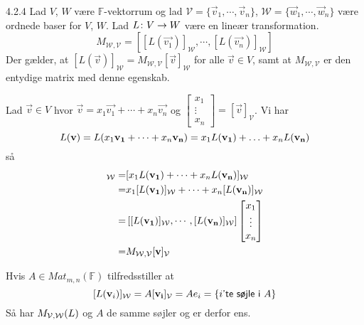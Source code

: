 %
% 

\begin{saetning}{4.2.4}
	Lad $V$, $W$ være $\mathbb{F}$-vektorrum og lad $\mathcal{V}=\{\vec{v}_1,
	\cdots,\vec{v}_n\}$, $\mathcal{W}=\{\vec{w}_1,\cdots,\vec{w}_n\}$ være
	ordnede baser for $V$, $W$. Lad $L \colon V \rightarrow W$ være en lineær transformation.
	\[
		M_{\mathcal{W},\mathcal{V}} = [[L(\vec{v_1})]_\mathcal{W}, \cdots,
		[L(\vec{v_n})]_\mathcal{W}]
	\]
	Der gælder, at $[L(\vec{v})]_\mathcal{W} = M_{\mathcal{W},\mathcal{V}}
	[\vec{v}]_\mathcal{W}$ for alle $\vec{v} \in V$, samt at
	$M_{\mathcal{W},\mathcal{V}}$ er den entydige matrix med denne egenskab.
\end{saetning}

\begin{bevis}
	Lad $\vec{v} \in V$ hvor $\vec{v} = x_1 \vec{v_1} + \cdots + x_n \vec{v_n}$
	og $\begin{bmatrix} x_1 \\ \vdots \\ x_n \end{bmatrix} =
	[\vec{v}]_\mathcal{V}$. Vi har
	\[
		L(\mathbf{v}) = L(x_1 \mathbf{v_1} + \cdots + x_n \mathbf{v_n}) = x_1L(\mathbf{v_1}) + 
		\dotsc + x_nL(\mathbf{v_n})
	\]
	så
	\begin{align*}
		[L(\vv)]_\sW =& [x_1 L(\vec{v_1}) + \cdots + x_n L(\vec{v_n})]_\sW \\
			=& x_1 [L(\vec{v_1})]_\sW + \cdots + x_n [L(\vec{v_n})]_\sW \\
			=& \left[ [L(\vec{v_1})]_\sW, \cdots, [L(\vec{v_n})]_\sW
				\right] \begin{bmatrix}
					x_1 \\
					\vdots \\
					x_n
				\end{bmatrix} \\
			=& M_{\sW,\sV} [\vv]_\sV
	\end{align*}

	Hvis $A \in Mat_{m,n}(\mathbb{F})$ tilfredsstiller at
	\[
		[L(\mathbf{v}_i)]_{\mathcal{W}} = A[\mathbf{v_i}]_{\mathcal{V}} = Ae_i = \{i \textsf{'te søjle i } A\}
	\]
	Så har $M_{\mathcal{V},\mathcal{W}}(L)$ og $A$ de samme søjler og er derfor ens.
\end{bevis}
